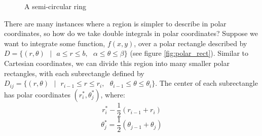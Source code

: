 \begin{figure}[htbp]
    \centering
    \caption{A semi-circular ring}
    \label{fig:semicircle}
\end{figure}

There are many instances where a region is simpler to describe in polar 
coordinates, so how do we take double integrals in polar coordinates? Suppose 
we want to integrate some function, $f(x,y)$, over a polar rectangle described 
by $\textit{D} = \{(r, \theta)\text{ }|\text{ }a \leq r \leq b,\text{ }\alpha 
\leq \theta \leq \beta \}$ (see figure \ref{fig:polar_rect}). Similar to 
Cartesian coordinates, we can divide this region into many smaller polar 
rectangles, with each subrectangle defined by $\textit{D}_{ij} = \{(r, \theta)
\text{ }|\text{ }r_{i-1} \leq r \leq r_i,\text{ }\theta_{i - 1} \leq \theta 
\leq \theta_i\}$. The center of each subrectangle has polar coordinates $(
r_i^*, \theta_j^*)$, where:
$$r_i^* - \frac{1}{2} \left( r_{i - 1} + r_i \right)$$
$$\theta_j^* = \frac{1}{2} \left( \theta_{j - 1} + \theta_j \right)$$ 

